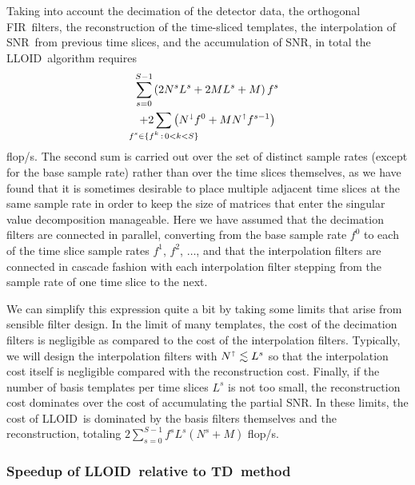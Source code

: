 \documentclass[preprint2]{aastex}
\newcommand{\SNR}{SNR}%
\newcommand{\numtmps}{\ensuremath{M}}
\newcommand{\svdtmps}[1]{\ensuremath{L^#1}}
\newcommand{\numsvdtmps}{\svdtmps{s}}
\newcommand{\slicesamps}[1]{\ensuremath{N^#1}}
\newcommand{\slicessamps}{\slicesamps{s}}
\newcommand{\fir}{FIR}%
\newcommand{\flops}{flop/s}
\newcommand{\lloid}{LLOID}%
\newcommand{\TD}{TD}%
\def\clap#1{\hbox to 0pt{\hss#1\hss}}
\def\mathclap{\mathpalette\mathclapinternal}
\def\mathclapinternal#1#2{\clap{$\mathsurround=0pt#1{#2}$}}
\begin{document}
Taking into account the decimation of the detector data, the orthogonal \fir\
filters, the reconstruction of the time-sliced templates, the interpolation of
\SNR\ from previous time slices, and the accumulation of \SNR, in total the
\lloid\ algorithm requires
%
\begin{multline}
\label{eq:lloid-flops}
\sum_{\mathclap{s=0}}^{\mathclap{S-1}} \left( 2 \slicessamps \numsvdtmps + 2 \numtmps \numsvdtmps + \numtmps \right) f^s \\ + 2\sum_{\mathclap{f^s \in \{f^k \, : \, 0 < k < S\}}} \left( N^\shortdownarrow f^0 + \numtmps N^\shortuparrow f^{s-1}\right)
\end{multline}
%
\flops.  The second sum is carried out over the set of distinct sample rates
(except for the base sample rate) rather than over the time slices themselves,
as we have found that it is sometimes desirable to place multiple adjacent time
slices at the same sample rate in order to keep the size of matrices that enter
the singular value decomposition manageable.  Here we have assumed that the
decimation filters are connected in parallel, converting from the base sample
rate $f^0$ to each of the time slice sample rates $f^1$, $f^2$, $\dots$, and
that the interpolation filters are connected in cascade fashion with each
interpolation filter stepping from the sample rate of one time slice to the
next.

We can simplify this expression quite a bit by taking some limits that arise
from sensible filter design.  In the limit of many templates, the cost of the
decimation filters is negligible as compared to the cost of the interpolation
filters.  Typically, we will design the interpolation filters with
$N^\shortuparrow \lesssim \numsvdtmps$ so that the interpolation cost itself is
negligible compared with the reconstruction cost.  Finally, if the number of
basis templates per time slices $\numsvdtmps$ is not too small, the
reconstruction cost dominates over the cost of accumulating the partial \SNR.
In these limits, the cost of \lloid\ is dominated by the basis filters
themselves and the reconstruction, totaling
$2 \sum_{s=0}^{S-1} f^s \numsvdtmps \left( \slicessamps + \numtmps \right)$ \flops.

\subsubsection{Speedup of \lloid\ relative to \TD\ method}
\end{document}
